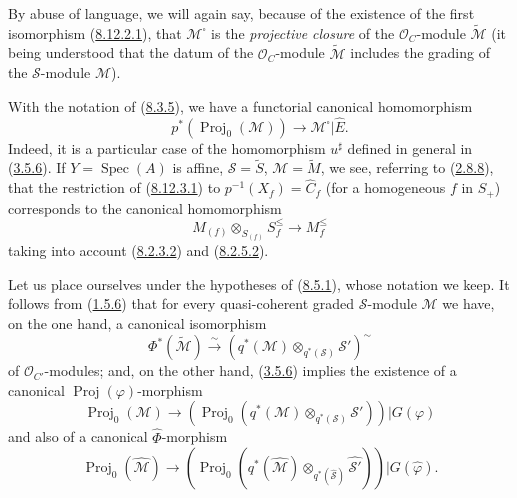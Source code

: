 By abuse of language, we will again say, because of the existence of the first
isomorphism (\hyperref[II.8.12.2.1]{8.12.2.1}), that
$\mathcal{M}^{\square}$ is the \emph{projective closure} of the
$\mathcal{O}_C$-module $\widetilde{\mathcal{M}}$ (it being understood that the
datum of the $\mathcal{O}_C$-module $\widetilde{\mathcal{M}}$ includes the
grading of the $\mathcal{S}$-module $\mathcal{M}$).

\begin{env}[8.12.3]
\label{II.8.12.3}
With the notation of (\hyperref[II.8.3.5]{8.3.5}), we have a functorial
canonical homomorphism
\begin{equation}
\label{II.8.12.3.1}
  p^*(\operatorname{Proj}_0(\mathcal{M}))
  \to\mathcal{M}^{\square}|\widehat{E}.
\tag{8.12.3.1}
\end{equation}
Indeed, it is a particular case of the homomorphism $u^{\sharp}$ defined in
general in (\hyperref[II.3.5.6]{3.5.6}). If
$Y=\operatorname{Spec}(A)$ is affine, $\mathcal{S}=\widetilde{S}$,
$\mathcal{M}=\widetilde{M}$, we see, referring to
(\hyperref[II.2.8.8]{2.8.8}), that the restriction of
(\hyperref[II.8.12.3.1]{8.12.3.1}) to
$p^{-1}(X_f)=\widehat{C}_f$ (for a homogeneous $f$ in $S_+$) corresponds to
the canonical homomorphism
\begin{equation}
\label{II.8.12.3.2}
  M_{(f)}\otimes_{S_{(f)}}S_f^{\leq}\to M_f^{\leq}
\tag{8.12.3.2}
\end{equation}
taking into account (\hyperref[II.8.2.3.2]{8.2.3.2}) and
(\hyperref[II.8.2.5.2]{8.2.5.2}).
\end{env}

\begin{env}[8.12.4]
\label{II.8.12.4}
Let us place ourselves under the hypotheses of (\hyperref[II.8.5.1]{8.5.1}),
whose notation we keep. It follows from
(\hyperref[II.1.5.6]{1.5.6}) that for every quasi-coherent graded
$\mathcal{S}$-module $\mathcal{M}$ we have, on the one hand, a canonical
isomorphism
\begin{equation}
\label{II.8.12.4.1}
  \Phi^*(\widetilde{\mathcal{M}})
  \xrightarrow{\sim}
  \left(q^*(\mathcal{M})\otimes_{q^*(\mathcal{S})}\mathcal{S}'\right)^{\sim}
\tag{8.12.4.1}
\end{equation}
of $\mathcal{O}_{C'}$-modules; and, on the other hand,
(\hyperref[II.3.5.6]{3.5.6}) implies the existence of a canonical
$\operatorname{Proj}(\varphi)$-morphism
\begin{equation}
\label{II.8.12.4.2}
  \operatorname{Proj}_0(\mathcal{M})\to
  \left(\operatorname{Proj}_0
  (q^*(\mathcal{M})\otimes_{q^*(\mathcal{S})}\mathcal{S}')\right)
  |G(\varphi)
\tag{8.12.4.2}
\end{equation}
and also of a canonical $\widehat{\Phi}$-morphism
\begin{equation}
\label{II.8.12.4.3}
  \operatorname{Proj}_0(\widehat{\mathcal{M}})\to
  \left(\operatorname{Proj}_0
  (q^*(\widehat{\mathcal{M}})
  \otimes_{q^*(\widehat{\mathcal{S}})}\widehat{\mathcal{S}'})\right)
  |G(\widehat{\varphi}).
\tag{8.12.4.3}
\end{equation}
\end{env}

